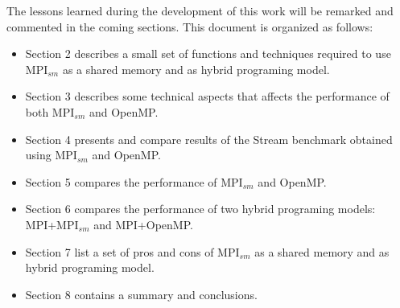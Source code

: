 \medskip

The lessons learned during the development of this work will be remarked and commented in the coming sections. This document is organized as follows:

\begin{itemize} 
\item Section 2 describes a small set of functions and techniques required to use MPI$_{sm}$ as a shared memory and as hybrid programing model.

\item Section 3 describes some technical aspects that affects the performance of both MPI$_{sm}$ and OpenMP.

\item Section 4 presents and compare results of the Stream benchmark obtained using MPI$_{sm}$ and OpenMP.

\item Section 5 compares the performance of MPI$_{sm}$ and OpenMP.

\item Section 6 compares the performance of two hybrid programing models: MPI+MPI$_{sm}$ and MPI+OpenMP.

\item Section 7 list a set of pros and cons of MPI$_{sm}$ as a shared memory and as hybrid programing model.

\item Section 8 contains a summary and conclusions.



\end{itemize}








